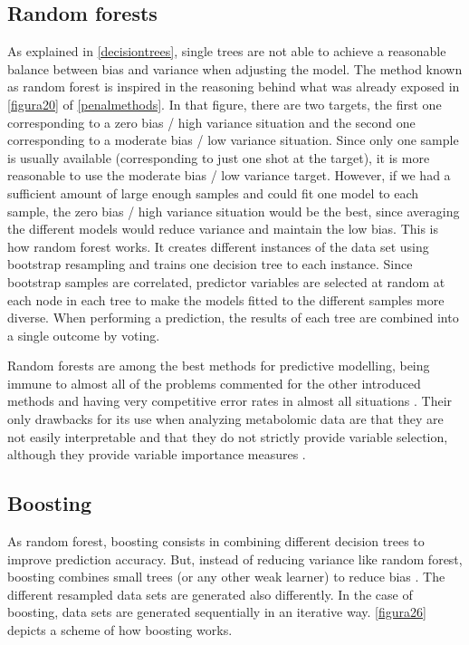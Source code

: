 \subsection{Random forests}
As explained in \autoref{decisiontrees}, single trees are not able to achieve a reasonable balance between bias and variance when adjusting the model. The method known as random forest \parencite{breiman2001random} is inspired in the reasoning behind what was already exposed in \autoref{figura20} of \autoref{penalmethods}. In that figure, there are two targets, the first one corresponding to a zero bias / high variance situation and the second one corresponding to a moderate bias / low variance situation. Since only one sample is usually available (corresponding to just one shot at the target), it is more reasonable to use the moderate bias / low variance target. However, if we had a sufficient amount of large enough samples and could fit one model to each sample, the zero bias / high variance situation would be the best, since averaging the different models would reduce variance and maintain the low bias. This is how random forest works. It creates different instances of the data set using bootstrap resampling \parencite{efron1994introduction} and trains one decision tree to each instance. Since bootstrap samples are correlated, predictor variables are selected at random at each node in each tree to make the models fitted to the different samples more diverse. When performing a prediction, the results of each tree are combined into a single outcome by voting. 

Random forests are among the best methods for predictive modelling, being immune to almost all of the problems commented for the other introduced methods and having very competitive error rates in almost all situations \parencite{fernandez2014we}. Their only drawbacks for its use when analyzing metabolomic data are that they are not easily interpretable and that they do not strictly provide variable selection, although they provide variable importance measures \parencite{archer2008empirical}.

\subsection{Boosting}
As random forest, boosting consists in combining different decision trees to improve prediction accuracy. But, instead of reducing variance like random forest, boosting combines small trees (or any other weak learner) to reduce bias \parencite{freund1996experiments}. The different resampled data sets are generated also differently. In the case of boosting, data sets are generated sequentially in an iterative way. \autoref{figura26} depicts a scheme of how boosting works.

